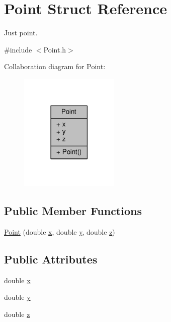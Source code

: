 \hypertarget{struct_point}{\section{Point Struct Reference}
\label{struct_point}
}


Just point.  




{\ttfamily \#include $<$Point.\-h$>$}



Collaboration diagram for Point\-:
\nopagebreak
\begin{figure}[H]
\begin{center}
\leavevmode
\includegraphics[width=134pt]{struct_point__coll__graph}
\end{center}
\end{figure}
\subsection*{Public Member Functions}
\begin{DoxyCompactItemize}
\item 
\hyperlink{struct_point_a4d43f5247afe8c85c6da1aa39dbcc738}{Point} (double \hyperlink{struct_point_ab99c56589bc8ad5fa5071387110a5bc7}{x}, double \hyperlink{struct_point_afa38be143ae800e6ad69ce8ed4df62d8}{y}, double \hyperlink{struct_point_a05ba3b1dfcb19430582ae953cbbfbded}{z})
\end{DoxyCompactItemize}
\subsection*{Public Attributes}
\begin{DoxyCompactItemize}
\item 
double \hyperlink{struct_point_ab99c56589bc8ad5fa5071387110a5bc7}{x}
\item 
double \hyperlink{struct_point_afa38be143ae800e6ad69ce8ed4df62d8}{y}
\item 
double \hyperlink{struct_point_a05ba3b1dfcb19430582ae953cbbfbded}{z}
\end{DoxyCompactItemize}



